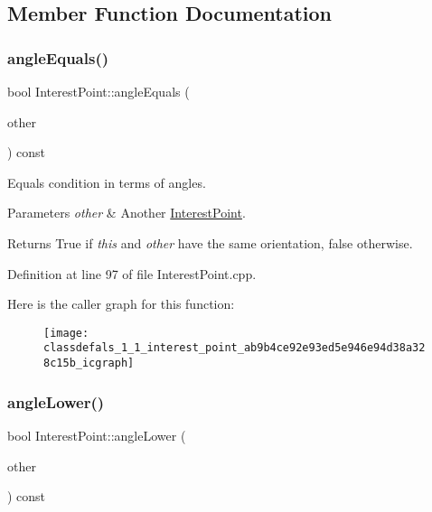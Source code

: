 \subsection{Member Function Documentation}
\mbox{\label{classdefals_1_1_interest_point_ab9b4ce92e93ed5e946e94d38a328c15b}} 
\subsubsection{\texorpdfstring{angle\+Equals()}{angleEquals()}}
{\footnotesize\ttfamily bool Interest\+Point\+::angle\+Equals (\begin{DoxyParamCaption}\item[{const \hyperlink{classdefals_1_1_interest_point}{Interest\+Point} \&}]{other }\end{DoxyParamCaption}) const}

Equals condition in terms of angles.


\begin{DoxyParams}{Parameters}
{\em other} & Another \hyperlink{classdefals_1_1_interest_point}{Interest\+Point}.\\
\hline
\end{DoxyParams}
\begin{DoxyReturn}{Returns}
True if {\itshape this} and {\itshape other} have the same orientation, false otherwise. 
\end{DoxyReturn}


Definition at line 97 of file Interest\+Point.\+cpp.

Here is the caller graph for this function\+:\nopagebreak
\begin{figure}[H]
\begin{center}
\leavevmode
\texttt{[image: classdefals\_1\_1\_interest\_point\_ab9b4ce92e93ed5e946e94d38a328c15b\_icgraph]}
\end{center}
\end{figure}
\mbox{\label{classdefals_1_1_interest_point_ac90c377bd678447a7dac9f0c17765976}} 
\subsubsection{\texorpdfstring{angle\+Lower()}{angleLower()}}
{\footnotesize\ttfamily bool Interest\+Point\+::angle\+Lower (\begin{DoxyParamCaption}\item[{const \hyperlink{classdefals_1_1_interest_point}{Interest\+Point} \&}]{other }\end{DoxyParamCaption}) const}

